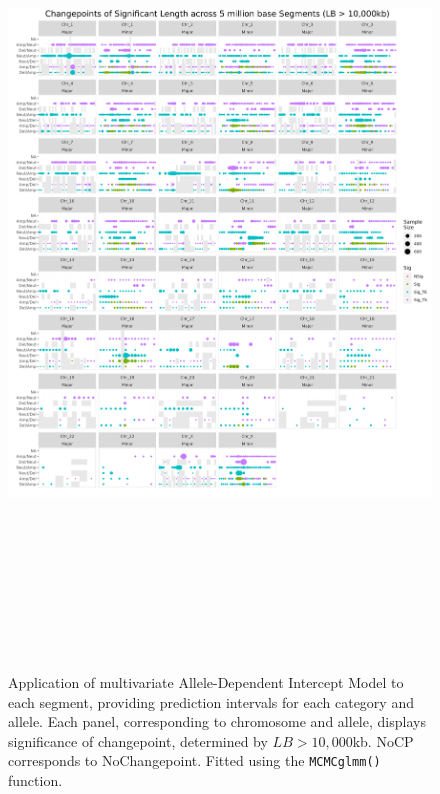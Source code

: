 \begin{figure}[H]
\centering
\includegraphics[width = 1\textwidth, height = 22cm]{../figures/Chapter_6/PerSegments_MCMC_10000kb_fivemillion_Thesis.png}
\caption[Application of multivariate Allele-Dependent Intercept Model to each segment, providing prediction intervals for each category and allele. Significance determined by $LB > 10,000$kb.]{Application of multivariate Allele-Dependent Intercept Model to each segment, providing prediction intervals for each category and allele. Each panel, corresponding to chromosome and allele, displays significance of changepoint, determined by $LB > 10,000$kb. NoCP corresponds to NoChangepoint. Fitted using the \texttt{MCMCglmm()} function.}
\label{fig:PerSegment_MCMC_10000}
\end{figure}

